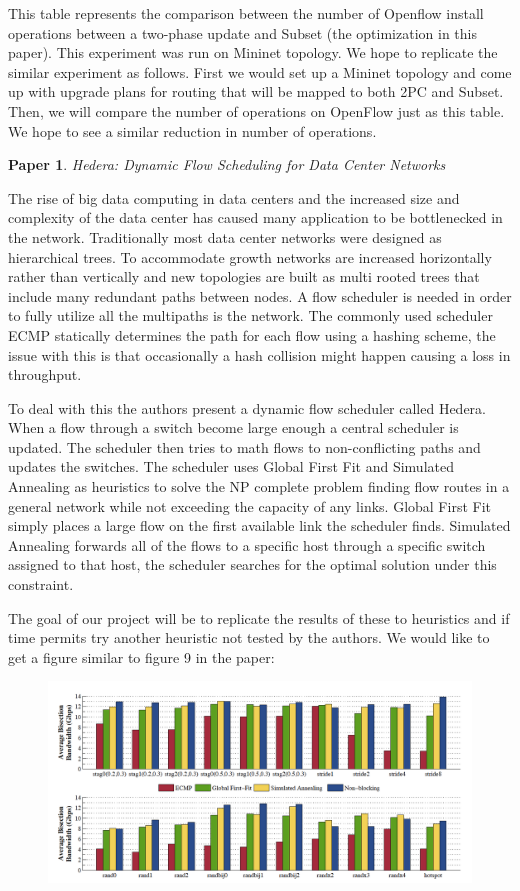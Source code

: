 \documentclass[11pt]{article}
\newtheorem{pb}{Paper}
\begin{document}
This table represents the comparison between the number of Openflow install operations between a two-phase update and Subset (the optimization in this paper). This experiment was run on Mininet topology. We hope to replicate the similar experiment as follows. First we would set up a Mininet topology and come up with upgrade plans for routing that will be mapped to both 2PC and Subset. Then, we will compare the number of operations on OpenFlow just as this table. We hope to see a similar reduction in number of operations.

\newpage
\begin{pb}
Hedera: Dynamic Flow Scheduling for Data Center Networks
\end{pb}

The rise of big data computing in data centers and the increased size and complexity of the data center has caused many  application to be bottlenecked in the network. Traditionally most data center networks were designed as hierarchical trees. To accommodate growth networks are increased horizontally rather than vertically and new topologies are built as multi rooted trees that include many redundant paths between nodes. A flow scheduler is needed in order to fully utilize all the multipaths is the network. The commonly used scheduler ECMP statically determines the path for each flow using a hashing scheme, the issue with this is that occasionally a hash collision might happen causing a loss in throughput. 

To deal with this the authors present a dynamic flow scheduler called Hedera. When a flow through a switch become large enough a central scheduler is updated. The scheduler then tries to math flows to non-conflicting paths and updates the switches. The scheduler uses Global First Fit and Simulated Annealing as heuristics to solve the NP complete problem finding flow routes in a general network while not exceeding the capacity of any links. Global First Fit simply places a large flow on the first available link the scheduler finds. Simulated Annealing forwards all of the flows to a specific host through a specific switch assigned to that host, the scheduler searches for the optimal solution under this constraint. 

The goal of our project will be to replicate the results of these to heuristics and if time permits try another heuristic not tested by the authors. We would like to get a figure similar to figure 9 in the paper:

\begin{figure}[H]
\includegraphics[width=16cm]{figure_9}
\centering
\end{figure}
\end{document}
